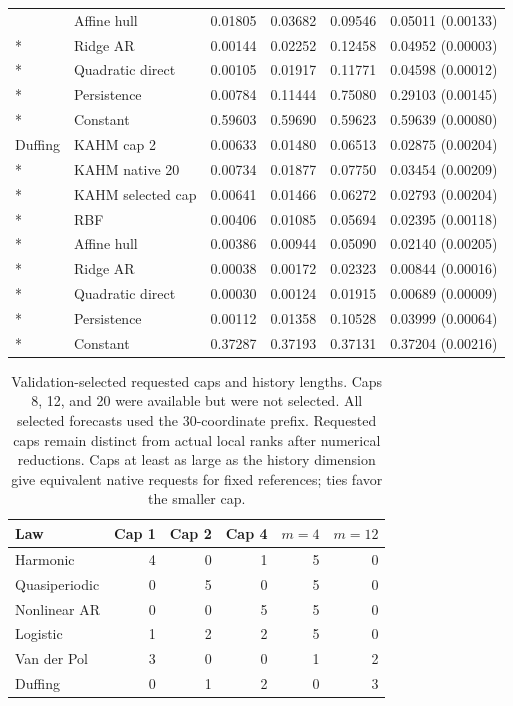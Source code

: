 \begin{longtable}{@{}llrrrr@{}}
 & Affine hull & 0.01805 & 0.03682 & 0.09546 & 0.05011 (0.00133) \\*
 & Ridge AR & 0.00144 & 0.02252 & 0.12458 & 0.04952 (0.00003) \\*
 & Quadratic direct & 0.00105 & 0.01917 & 0.11771 & 0.04598 (0.00012) \\*
 & Persistence & 0.00784 & 0.11444 & 0.75080 & 0.29103 (0.00145) \\*
 & Constant & 0.59603 & 0.59690 & 0.59623 & 0.59639 (0.00080) \\
\addlinespace
Duffing & KAHM cap 2 & 0.00633 & 0.01480 & 0.06513 & 0.02875 (0.00204) \\*
 & KAHM native 20 & 0.00734 & 0.01877 & 0.07750 & 0.03454 (0.00209) \\*
 & KAHM selected cap & 0.00641 & 0.01466 & 0.06272 & 0.02793 (0.00204) \\*
 & RBF & 0.00406 & 0.01085 & 0.05694 & 0.02395 (0.00118) \\*
 & Affine hull & 0.00386 & 0.00944 & 0.05090 & 0.02140 (0.00205) \\*
 & Ridge AR & 0.00038 & 0.00172 & 0.02323 & 0.00844 (0.00016) \\*
 & Quadratic direct & 0.00030 & 0.00124 & 0.01915 & 0.00689 (0.00009) \\*
 & Persistence & 0.00112 & 0.01358 & 0.10528 & 0.03999 (0.00064) \\*
 & Constant & 0.37287 & 0.37193 & 0.37131 & 0.37204 (0.00216) \\
\end{longtable}
\endgroup

\begin{table}[htbp]
\centering\small
\begin{tabular}{@{}lrrrrr@{}}
\toprule
Law & Cap 1 & Cap 2 & Cap 4 & $m=4$ & $m=12$ \\
\midrule
Harmonic & 4 & 0 & 1 & 5 & 0 \\
Quasiperiodic & 0 & 5 & 0 & 5 & 0 \\
Nonlinear AR & 0 & 0 & 5 & 5 & 0 \\
Logistic & 1 & 2 & 2 & 5 & 0 \\
Van der Pol & 3 & 0 & 0 & 1 & 2 \\
Duffing & 0 & 1 & 2 & 0 & 3 \\
\bottomrule
\end{tabular}
\caption{Validation-selected requested caps and history lengths.
Caps 8, 12, and 20 were available but were not selected.
All selected forecasts used the 30-coordinate prefix. Requested caps
remain distinct from actual local ranks after numerical reductions.
Caps at least as large as the history dimension give equivalent native
requests for fixed references; ties favor the smaller cap.}
\label{tab:dimension-policy-choices}
\end{table}

